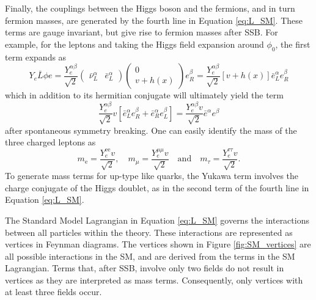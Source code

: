 Finally, the couplings between the Higgs boson and the fermions, and in turn fermion masses, are generated by the fourth line in Equation \eqref{eq:L_SM}. These terms are gauge invariant, but give rise to fermion masses after SSB. For example, for the leptons and taking the Higgs field expansion around $\phi_0$, the first term expands as
\begin{equation*}
    Y_{e}\bar{L}\phi e = \frac{Y_e^{\alpha\beta}}{\sqrt{2}}
    \begin{pmatrix}
        \bar{\nu}_{L}^{\alpha} & \bar{e}_{L}^{\alpha}
    \end{pmatrix}
    \begin{pmatrix}
        0\\
        v + h(x)
    \end{pmatrix}
    e_{R}^{\beta} = \frac{Y_e^{\alpha\beta}}{\sqrt{2}}\left[v + h(x)\right] \bar{e}_{L}^{\alpha}e_{R}^{\beta}
\end{equation*}
which in addition to its hermitian conjugate will ultimately yield the term
\begin{equation*}
    \frac{Y_e^{\alpha\beta}}{\sqrt{2}} v \left[\bar{e}_{L}^{\alpha}e_{R}^{\beta} + \bar{e}_{R}^{\alpha}e_{L}^{\beta}\right] = \frac{Y_e^{\alpha\beta}v}{\sqrt{2}} \bar{e}^{\alpha}e^{\beta}
\end{equation*}
after spontaneous symmetry breaking. One can easily identify the mass of the three charged leptons as
\begin{equation*}
    m_{\text{e}} = \frac{Y_e^{\text{e}\text{e}} v}{\sqrt{2}},\quad m_{\mu} = \frac{Y_e^{\mu\mu} v}{\sqrt{2}}\quad\text{and}\quad m_{\tau} = \frac{Y_e^{\tau\tau} v}{\sqrt{2}}.
\end{equation*}
To generate mass terms for up-type like quarks, the Yukawa term involves the charge conjugate of the Higgs doublet, as in the second term of the fourth line in Equation \eqref{eq:L_SM}.

The Standard Model Lagrangian in Equation \eqref{eq:L_SM} governs the interactions between all particles within the theory. These interactions are represented as vertices in Feynman diagrams. The vertices shown in Figure \ref{fig:SM_vertices} are all possible interactions in the SM, and are derived from the terms in the SM Lagrangian. Terms that, after SSB, involve only two fields do not result in vertices as they are interpreted as mass terms. Consequently, only vertices with at least three fields occur.


